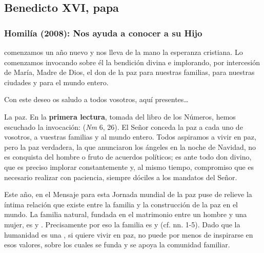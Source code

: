 \subsection{Benedicto XVI, papa}

\subsubsection{Homilía (2008): Nos ayuda a conocer a su Hijo}


\begin{body}
	 comenzamos un año nuevo y nos lleva de la mano la esperanza cristiana. Lo comenzamos invocando sobre él la bendición divina e implorando, por intercesión de María, Madre de Dios, el don de la paz para nuestras familias, para nuestras ciudades y para el mundo entero.
	
	Con este deseo os saludo a todos vosotros, aquí presentes\ldots{}
	
	La paz. En la \textbf{primera lectura}, tomada del libro de los Números, hemos escuchado la invocación:  (\emph{Nm} 6, 26). El Señor conceda la paz a cada uno de vosotros, a vuestras familias y al mundo entero. Todos aspiramos a vivir en paz, pero la paz verdadera, la que anunciaron los ángeles en la noche de Navidad, no es conquista del hombre o fruto de acuerdos políticos; es ante todo don divino, que es preciso implorar constantemente y, al mismo tiempo, compromiso que es necesario realizar con paciencia, siempre dóciles a los mandatos del Señor.
	
	Este año, en el Mensaje para esta Jornada mundial de la paz puse de relieve la íntima relación que existe entre la familia y la construcción de la paz en el mundo. La familia natural, fundada en el matrimonio entre un hombre y una mujer, es  y . Precisamente por eso la familia es  y  (cf. nn. 1-5). Dado que la humanidad es una , si quiere vivir en paz, no puede por menos de inspirarse en esos valores, sobre los cuales se funda y se apoya la comunidad familiar.
	

\end{body}
